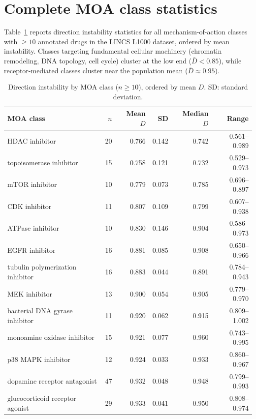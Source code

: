 \documentclass[11pt]{article}
\begin{document}



\appendix
\section{Complete MOA class statistics}
\label{app:moa}

Table~\ref{tab:moa_full} reports direction instability statistics for all
mechanism-of-action classes with $\geq 10$ annotated drugs in the LINCS L1000
dataset, ordered by mean instability. Classes targeting fundamental
cellular machinery (chromatin remodeling, DNA topology, cell cycle) cluster
at the low end ($\bar{D} < 0.85$), while receptor-mediated classes cluster
near the population mean ($\bar{D} \approx 0.95$).

\begin{table}[h]
\centering
\caption{Direction instability by MOA class ($n \geq 10$), ordered by
mean $D$. SD: standard deviation.}
\label{tab:moa_full}
\small
\begin{tabular}{lrrrrr}
\toprule
MOA class & $n$ & Mean $D$ & SD & Median $D$ & Range \\
\midrule
HDAC inhibitor & 20 & 0.766 & 0.142 & 0.742 & 0.561--0.989 \\
topoisomerase inhibitor & 15 & 0.758 & 0.121 & 0.732 & 0.529--0.973 \\
mTOR inhibitor & 10 & 0.779 & 0.073 & 0.785 & 0.696--0.897 \\
CDK inhibitor & 11 & 0.807 & 0.109 & 0.799 & 0.607--0.938 \\
ATPase inhibitor & 10 & 0.830 & 0.146 & 0.904 & 0.586--0.973 \\
EGFR inhibitor & 16 & 0.881 & 0.085 & 0.908 & 0.650--0.966 \\
tubulin polymerization inhibitor & 16 & 0.883 & 0.044 & 0.891 & 0.784--0.943 \\
MEK inhibitor & 13 & 0.900 & 0.054 & 0.905 & 0.779--0.970 \\
bacterial DNA gyrase inhibitor & 11 & 0.920 & 0.062 & 0.915 & 0.809--1.002 \\
monoamine oxidase inhibitor & 15 & 0.921 & 0.077 & 0.960 & 0.743--0.995 \\
p38 MAPK inhibitor & 12 & 0.924 & 0.033 & 0.933 & 0.860--0.967 \\
dopamine receptor antagonist & 47 & 0.932 & 0.048 & 0.948 & 0.799--0.993 \\
glucocorticoid receptor agonist & 29 & 0.933 & 0.041 & 0.950 & 0.808--0.974 \\

\end{tabular}
\end{table}
\end{document}
